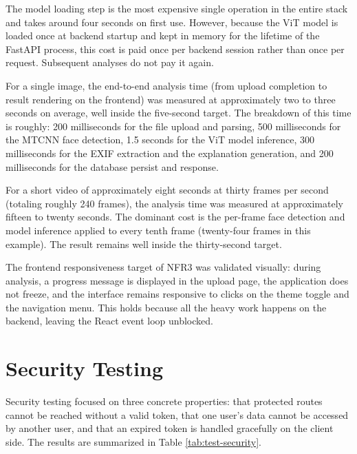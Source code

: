 The model loading step is the most expensive single operation in the entire stack and takes around four seconds on first use. However, because the ViT model is loaded once at backend startup and kept in memory for the lifetime of the FastAPI process, this cost is paid once per backend session rather than once per request. Subsequent analyses do not pay it again.

For a single image, the end-to-end analysis time (from upload completion to result rendering on the frontend) was measured at approximately two to three seconds on average, well inside the five-second target. The breakdown of this time is roughly: 200 milliseconds for the file upload and parsing, 500 milliseconds for the MTCNN face detection, 1.5 seconds for the ViT model inference, 300 milliseconds for the EXIF extraction and the explanation generation, and 200 milliseconds for the database persist and response.

For a short video of approximately eight seconds at thirty frames per second (totaling roughly 240 frames), the analysis time was measured at approximately fifteen to twenty seconds. The dominant cost is the per-frame face detection and model inference applied to every tenth frame (twenty-four frames in this example). The result remains well inside the thirty-second target.

The frontend responsiveness target of NFR3 was validated visually: during analysis, a progress message is displayed in the upload page, the application does not freeze, and the interface remains responsive to clicks on the theme toggle and the navigation menu. This holds because all the heavy work happens on the backend, leaving the React event loop unblocked.

\section{Security Testing}

Security testing focused on three concrete properties: that protected routes cannot be reached without a valid token, that one user's data cannot be accessed by another user, and that an expired token is handled gracefully on the client side. The results are summarized in Table \ref{tab:test-security}.

